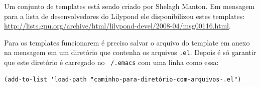 \documentclass[12pt,brazil]{book}
\begin{document}
Um conjunto de templates está sendo criado por Shelagh Manton. Em
mensagem para a lista de desenvolvedores do Lilypond ele
disponibilizou estes templates:
\url{http://lists.gnu.org/archive/html/lilypond-devel/2008-04/msg00116.html}.

Para os templates funcionarem é preciso salvar o arquivo do template
em anexo na mensagem em um diretório que contenha os arquivos
\texttt{.el}. Depois é só garantir que este diretório é carregado no
\texttt{~/.emacs} com uma linha como essa:

\begin{verbatim}
(add-to-list 'load-path "caminho-para-diretório-com-arquivos-.el")
\end{verbatim}
\end{document}
